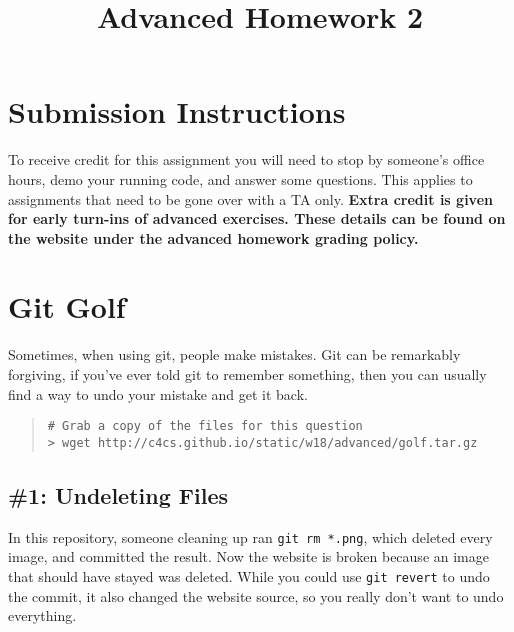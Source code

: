 \documentclass{article}
\begin{document}
\fancyfoot[C]{\color{gray} \thepage~/~\pageref*{LastPage}}
\pagestyle{fancyplain}

\title{\textbf{Advanced Homework 2\\}}
\author{\textbf{\color{red}{Due: Wednesday, January 24th, 11:59PM (Hard Deadline)}}}
\date{}
\maketitle


\section*{Submission Instructions}
To receive credit for this assignment you will need to stop by someone's
office hours, demo your running code, and answer some questions. \textbf{\color{red}{Make sure
to check the office hour schedule as the real due date is at the last office
hours before the date listed above.}} This applies to assignments that need to be gone over with a TA only.
\textbf{Extra credit is given for early turn-ins of advanced exercises. These details can be found on the website under the advanced homework grading policy.}


\section{Git Golf}

Sometimes, when using git, people make mistakes. Git can be remarkably
forgiving, if you've ever told git to remember something, then you can usually
find a way to undo your mistake and get it back.

\begin{quote}
\begin{lstlisting}
# Grab a copy of the files for this question
> wget http://c4cs.github.io/static/w18/advanced/golf.tar.gz
\end{lstlisting}
\end{quote}

\subsection*{\#1: Undeleting Files}

In this repository, someone cleaning up ran
\texttt{git~rm~*.png}, which deleted every image, and committed the result.
Now the website is broken because an image that should have stayed was
deleted. While you could use \texttt{git~revert} to undo the commit, it also
changed the website source, so you really don't want to undo everything.
\end{document}
